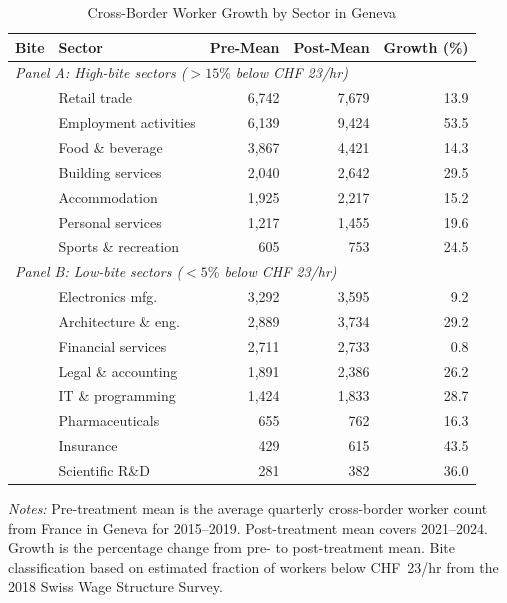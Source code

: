 \begin{table}[htbp]
\centering
\caption{Cross-Border Worker Growth by Sector in Geneva}
\label{tab:sectors}
\begin{tabular}{llrrr}
\toprule
Bite & Sector & Pre-Mean & Post-Mean & Growth (\%) \\
\midrule
\multicolumn{5}{l}{\textit{Panel A: High-bite sectors ($>15\%$ below CHF 23/hr)}} \\
 & Retail trade & 6,742 & 7,679 & 13.9 \\
 & Employment activities & 6,139 & 9,424 & 53.5 \\
 & Food \& beverage & 3,867 & 4,421 & 14.3 \\
 & Building services & 2,040 & 2,642 & 29.5 \\
 & Accommodation & 1,925 & 2,217 & 15.2 \\
 & Personal services & 1,217 & 1,455 & 19.6 \\
 & Sports \& recreation & 605 & 753 & 24.5 \\
\midrule
\multicolumn{5}{l}{\textit{Panel B: Low-bite sectors ($<5\%$ below CHF 23/hr)}} \\
 & Electronics mfg. & 3,292 & 3,595 & 9.2 \\
 & Architecture \& eng. & 2,889 & 3,734 & 29.2 \\
 & Financial services & 2,711 & 2,733 & 0.8 \\
 & Legal \& accounting & 1,891 & 2,386 & 26.2 \\
 & IT \& programming & 1,424 & 1,833 & 28.7 \\
 & Pharmaceuticals & 655 & 762 & 16.3 \\
 & Insurance & 429 & 615 & 43.5 \\
 & Scientific R\&D & 281 & 382 & 36.0 \\
\bottomrule
\end{tabular}
\begin{tablenotes}
\small
\item \textit{Notes:} Pre-treatment mean is the average quarterly cross-border worker count from France in Geneva for 2015--2019. Post-treatment mean covers 2021--2024. Growth is the percentage change from pre- to post-treatment mean. Bite classification based on estimated fraction of workers below CHF~23/hr from the 2018 Swiss Wage Structure Survey.
\end{tablenotes}
\end{table}
